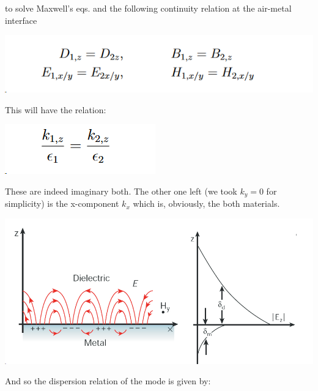 \documentclass[11pt]{article}
\begin{document}
to solve Maxwell's eqs. and the following continuity relation at the
air-metal interface

\begin{center}
\includegraphics[width=.9\linewidth]{./Surface_plasmon_polaritons_(SPP)/2023-08-22_15-38-37_screenshot.png}
\end{center}



This will have the relation:


\begin{center}
\includegraphics[width=.9\linewidth]{./Surface_plasmon_polaritons_(SPP)/2023-08-22_15-40-20_screenshot.png}
\end{center}

These are indeed imaginary both. The other one left (we took \(k_y=0\)
for simplicity) is the x-component \(k_x\) which is, obviously, the both
materials.


\begin{center}
\includegraphics[width=.9\linewidth]{./Surface_plasmon_polaritons_(SPP)/2023-08-22_15-45-12_screenshot.png}
\end{center}



And so the dispersion relation of the mode is given by:
\end{document}
